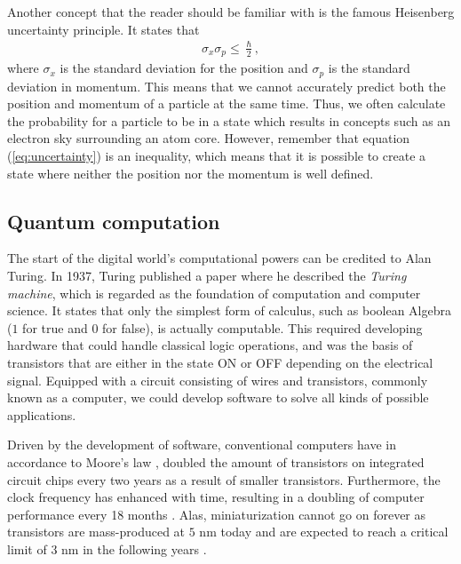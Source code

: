 
Another concept that the reader should be familiar with is the famous Heisenberg uncertainty principle. It states that
\begin{align}
    \sigma_x \sigma_p \leq \frac{\hslash}{2},
    \label{eq:uncertainty}
\end{align}
where $\sigma_x$ is the standard deviation for the position and $\sigma_p$ is the standard deviation in momentum. This means that we cannot accurately predict both the position and momentum of a particle at the same time. Thus, we often calculate the probability for a particle to be in a state which results in concepts such as an electron sky surrounding an atom core. However, remember that equation (\ref{eq:uncertainty}) is an inequality, which means that it is possible to create a state where neither the position nor the momentum is well defined.

\subsection{Quantum computation}
The start of the digital world's computational powers can be credited to Alan Turing. In 1937, Turing \cite{Turing1937} published a paper where he described the \textit{Turing machine}, which is regarded as the foundation of computation and computer science. It states that only the simplest form of calculus, such as boolean Algebra ($1$ for true and $0$ for false), is actually computable. This required developing hardware that could handle classical logic operations, and was the basis of transistors that are either in the state ON or OFF depending on the electrical signal. Equipped with a circuit consisting of wires and transistors, commonly known as a computer, we could develop software to solve all kinds of possible applications.

Driven by the development of software, conventional computers have in accordance to Moore's law \cite{Moore1965}, doubled the amount of transistors on integrated circuit chips every two years as a result of smaller transistors. Furthermore, the clock frequency has enhanced with time, resulting in a doubling of computer performance every 18 months \cite{Pavicic2006}. Alas, miniaturization cannot go on forever as transistors are mass-produced at $5$ nm today and are expected to reach a critical limit of $3$ nm in the following years \cite{Gwennap2020}.

